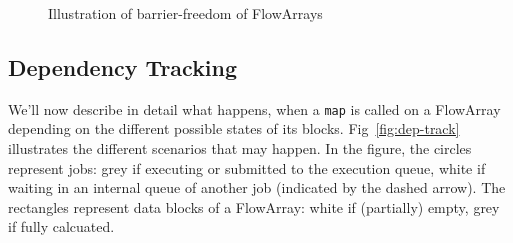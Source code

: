 \documentclass[runningheads,a4paper,fleqn]{llncs}
\begin{document}
\begin{figure}
  \caption{Illustration of barrier-freedom of FlowArrays}
  \label{fig:barrier-free}
\end{figure}

\subsection{Dependency Tracking}
We'll now describe in detail what happens, when a \texttt{map} is
called on a FlowArray depending on the different possible states of
its blocks. Fig~\ref{fig:dep-track} illustrates the different
scenarios that may happen. In the figure, the circles represent jobs:
grey if executing or submitted to the execution queue, white if
waiting in an internal queue of another job (indicated by the dashed
arrow). The rectangles represent data blocks of a FlowArray: white if
(partially) empty, grey if fully calcuated.
\end{document}
